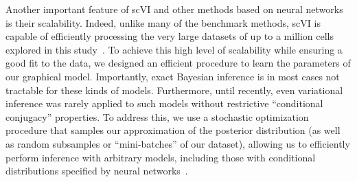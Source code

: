 
Another important feature of scVI and other methods based on neural networks~\cite{scvis,VASC,dca,scVAE} is their scalability. Indeed, unlike many of the benchmark methods, scVI is capable of efficiently processing the very large datasets of up to a million cells explored in this study~\cite{Regev2017,10x}. To achieve this high level of scalability while ensuring a good fit to the data, we designed an efficient procedure to learn the parameters of our graphical model. Importantly, exact Bayesian inference is in most cases not tractable for these kinds of models. Furthermore, until recently, even variational inference was rarely applied to such models without restrictive ``conditional conjugacy'' properties. To address this, we use a stochastic optimization procedure that samples our approximation of the posterior distribution (as well as random subsamples or ``mini-batches'' of our dataset), allowing us to efficiently perform inference with arbitrary models, including those with conditional distributions specified by neural networks~\cite{kingma2013}.

 

